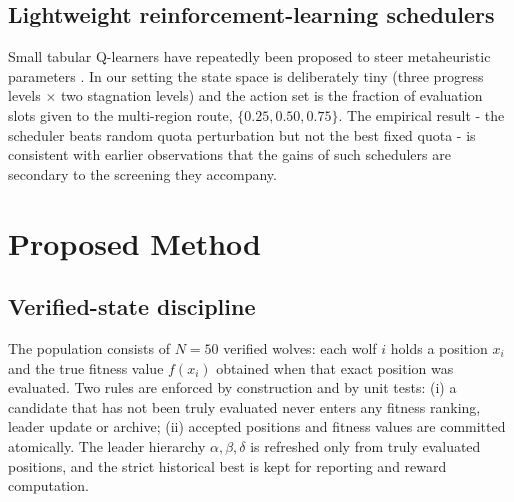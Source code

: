 \documentclass[journal]{IEEEtran}
\begin{document}
\subsection{Lightweight reinforcement-learning schedulers}
Small tabular Q-learners have repeatedly been proposed to steer metaheuristic
parameters \cite{maleki2025rlgwo,huang2026qlfdgwo,nayeem2025qgwo}. In our setting the state space is deliberately tiny (three
progress levels $\times$ two stagnation levels) and the action set is the
fraction of evaluation slots given to the multi-region route,
$\{0.25,0.50,0.75\}$. The empirical result - the scheduler beats random
quota perturbation but not the best fixed quota - is consistent with earlier
observations that the gains of such schedulers are secondary to the screening
they accompany.

\section{Proposed Method}
\label{sec:method}
\subsection{Verified-state discipline}
The population consists of $N=50$ verified wolves: each wolf $i$ holds a
position $x_i$ and the true fitness value $f(x_i)$ obtained when that exact
position was evaluated. Two rules are enforced by construction and by unit
tests: (i) a candidate that has not been truly evaluated never enters any
fitness ranking, leader update or archive; (ii) accepted positions and
fitness values are committed atomically. The leader hierarchy
$\alpha,\beta,\delta$ is refreshed only from truly evaluated positions, and
the strict historical best is kept for reporting and reward computation.
\end{document}
